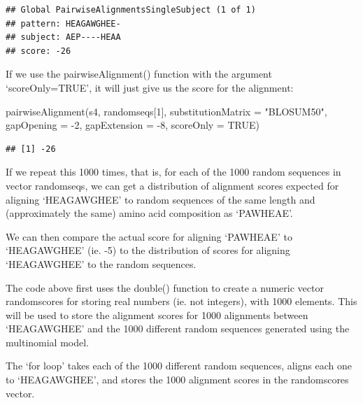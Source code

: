 \documentclass[
]{book}
\newenvironment{Shaded}{\begin{snugshade}}{\end{snugshade}}
\newcommand{\AttributeTok}[1]{\textcolor[rgb]{0.77,0.63,0.00}{#1}}
\newcommand{\ConstantTok}[1]{\textcolor[rgb]{0.00,0.00,0.00}{#1}}
\newcommand{\DecValTok}[1]{\textcolor[rgb]{0.00,0.00,0.81}{#1}}
\newcommand{\FunctionTok}[1]{\textcolor[rgb]{0.00,0.00,0.00}{#1}}
\newcommand{\NormalTok}[1]{#1}
\newcommand{\SpecialCharTok}[1]{\textcolor[rgb]{0.00,0.00,0.00}{#1}}
\newcommand{\StringTok}[1]{\textcolor[rgb]{0.31,0.60,0.02}{#1}}
\begin{document}
\begin{verbatim}
## Global PairwiseAlignmentsSingleSubject (1 of 1)
## pattern: HEAGAWGHEE-
## subject: AEP----HEAA
## score: -26
\end{verbatim}

If we use the pairwiseAlignment() function with the argument `scoreOnly=TRUE', it will just give us the score for the alignment:

\begin{Shaded}
\begin{Highlighting}[]
\FunctionTok{pairwiseAlignment}\NormalTok{(s4, randomseqs[}\DecValTok{1}\NormalTok{], }\AttributeTok{substitutionMatrix =} \StringTok{"BLOSUM50"}\NormalTok{, }\AttributeTok{gapOpening =} \SpecialCharTok{{-}}\DecValTok{2}\NormalTok{,}
  \AttributeTok{gapExtension =} \SpecialCharTok{{-}}\DecValTok{8}\NormalTok{, }\AttributeTok{scoreOnly =} \ConstantTok{TRUE}\NormalTok{)}
\end{Highlighting}
\end{Shaded}

\begin{verbatim}
## [1] -26
\end{verbatim}

If we repeat this 1000 times, that is, for each of the 1000 random sequences in vector randomseqs, we can get a distribution of alignment scores expected for aligning `HEAGAWGHEE' to random sequences of the same length and (approximately the same) amino acid composition as `PAWHEAE'.

We can then compare the actual score for aligning `PAWHEAE' to `HEAGAWGHEE' (ie. -5) to the distribution of scores for aligning `HEAGAWGHEE' to the random sequences.

The code above first uses the double() function to create a numeric vector randomscores for storing real numbers (ie. not integers), with 1000 elements. This will be used to store the alignment scores for 1000 alignments between `HEAGAWGHEE' and the 1000 different random sequences generated using the multinomial model.

The `for loop' takes each of the 1000 different random sequences, aligns each one to `HEAGAWGHEE', and stores the 1000 alignment scores in the randomscores vector.
\end{document}
